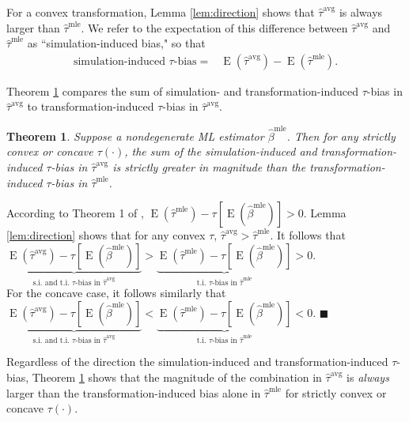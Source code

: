 \documentclass[11pt]{article}
\newtheorem{theorem}{Theorem}
\newenvironment{proof}[1][Proof]{\begin{trivlist}
\item[\hskip \labelsep {\bfseries #1}]}{\end{trivlist}}
\DeclareMathOperator*{\E}{\text{E}}
\begin{document}
For a convex transformation, Lemma \ref{lem:direction} shows that $\hat{\tau}^\text{avg}$ is always larger than $\hat{\tau}^\text{mle}$. We refer to the expectation of this difference between $\hat{\tau}^\text{avg}$ and $\hat{\tau}^\text{mle}$ as ``simulation-induced bias," so that
\begin{align*}
\text{simulation-induced } \tau\text{-bias} =& \E \left(\hat{\tau}^\text{avg} \right) - \E \left(\hat{\tau}^\text{mle} \right).
\end{align*}

Theorem \ref{thm:direction} compares the sum of simulation- and transformation-induced $\tau$-bias in $\hat{\tau}^\text{avg}$ to transformation-induced $\tau$-bias in $\hat{\tau}^\text{avg}$.

\begin{theorem}\label{thm:direction}
Suppose a nondegenerate ML estimator $\hat{\beta}^\text{mle}$.
Then for any strictly convex or concave $\tau(\cdot)$, the sum of the simulation-induced and transformation-induced $\tau$-bias in $\hat{\tau}^{\text{avg}}$ is strictly greater in magnitude than the transformation-induced $\tau$-bias in $\hat{\tau}^{\text{mle}}$.
\end{theorem}
\begin{proof}
According to Theorem 1 of \citet[p.\@ 405]{Rainey2017}, $\E \left( \hat{\tau}^\text{mle}\right) -  \tau \left[\E \left( \hat{\beta}^\text{mle} \right) \right] > 0$.
Lemma \ref{lem:direction} shows that for any convex $\tau$, $\hat{\tau}^{\text{avg}} > \hat{\tau}^\text{mle}$.
It follows that $\underbrace{\E \left( \hat{\tau}^\text{avg}\right) - \tau \left[\E \left( \hat{\beta}^\text{mle} \right) \right]}_{\text{s.i. and t.i. } \tau\text{-bias in }\hat{\tau}^{\text{avg}}} > \underbrace{\E \left( \hat{\tau}^\text{mle}\right) -  \tau \left[\E \left( \hat{\beta}^\text{mle} \right) \right]}_{\text{t.i. } \tau\text{-bias in }\hat{\tau}^{\text{mle}}} > 0$.\\

\noindent For the concave case, it follows similarly that $\underbrace{\E \left( \hat{\tau}^\text{avg}\right) - \tau \left[\E \left( \hat{\beta}^\text{mle} \right) \right]}_{\text{s.i. and t.i. } \tau\text{-bias in }\hat{\tau}^{\text{avg}}} < \underbrace{\E \left( \hat{\tau}^\text{mle}\right) -  \tau \left[\E \left( \hat{\beta}^\text{mle} \right) \right]}_{\text{t.i. } \tau\text{-bias in }\hat{\tau}^{\text{mle}}} < 0$.
 $\blacksquare$
\end{proof}
Regardless of the direction the simulation-induced and transformation-induced $\tau$-bias, Theorem \ref{thm:direction} shows that the magnitude of the combination in $\hat{\tau}^{\text{avg}}$
is \textit{always} larger than the transformation-induced bias alone in  $\hat{\tau}^{\text{mle}}$ for strictly convex or concave $\tau(\cdot)$. 
\end{document}
